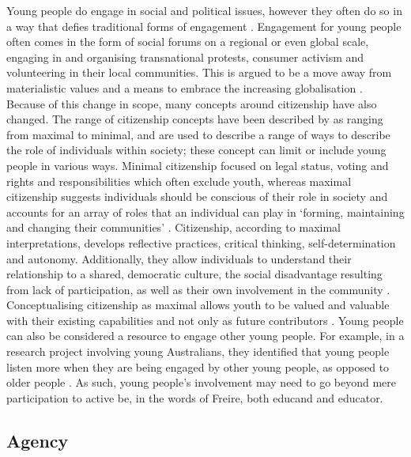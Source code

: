 Young people do engage in social and political issues, however they often do so in a way that defies traditional forms of engagement \citep{Harris2010}. Engagement for young people often comes in the form of social forums on a regional or even global scale, engaging in and organising transnational protests, consumer activism and volunteering in their local communities. This is argued to be a move away from materialistic values and a means to embrace the increasing globalisation \citep[][p3]{Bennett2003}. Because of this change in scope, many concepts around citizenship have also changed. The range of citizenship concepts have been described by \citet{White2008} as ranging from maximal to minimal, and are used to describe a range of ways to describe the role of individuals within society; these concept can limit or include young people in various ways. Minimal citizenship focused on legal status, voting and rights and responsibilities which often exclude youth, whereas maximal citizenship suggests individuals should be conscious of their role in society and accounts for an array of roles that an individual can play in ‘forming, maintaining and changing their communities’ \citep[][p108]{White2008}. Citizenship, according to maximal interpretations, develops reflective practices, critical thinking, self-determination and autonomy. Additionally, they allow individuals to understand their relationship to a shared, democratic culture, the social disadvantage resulting from lack of participation, as well as their own involvement in the community \citep[][p109]{White2008}. Conceptualising citizenship as maximal allows youth to be valued and valuable with their existing capabilities and not only as future contributors \citep[][]{White2008}. Young people can also be considered a resource to engage other young people. For example, in a research project involving young Australians, they identified that young people listen more when they are being engaged by other young people, as opposed to older people \citep{Harris2010}. As such, young people's involvement may need to go beyond mere participation to active be, in the words of Freire, both educand and educator. 

\subsection{Agency}
\label{AgencySoc}


